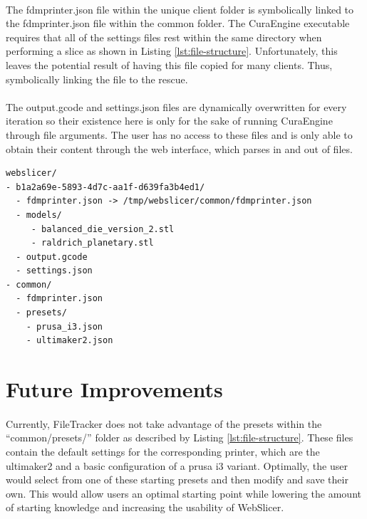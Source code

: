 \paragraph{}
The fdmprinter.json file within the unique client folder is symbolically linked to the fdmprinter.json file within the common folder. 
The CuraEngine executable requires that all of the settings files rest within the same directory when performing a slice as shown in Listing \ref{lst:file-structure}.
Unfortunately, this leaves the potential result of having this file copied for many clients. 
Thus, symbolically linking the file to the rescue.

\paragraph{}
The output.gcode and settings.json files are dynamically overwritten for every iteration so their existence here is only for the sake of running CuraEngine through file arguments.
The user has no access to these files and is only able to obtain their content through the web interface, which parses in and out of files.

\begin{lstlisting}[language=XML, label={lst:file-structure}, caption=WebSlicer's underlying file structure supported by FileTracker.]
webslicer/
- b1a2a69e-5893-4d7c-aa1f-d639fa3b4ed1/
  - fdmprinter.json -> /tmp/webslicer/common/fdmprinter.json
  - models/
     - balanced_die_version_2.stl
     - raldrich_planetary.stl
  - output.gcode
  - settings.json
- common/
  - fdmprinter.json
  - presets/
    - prusa_i3.json
    - ultimaker2.json
\end{lstlisting}

\section{Future Improvements}
\paragraph{}
Currently, FileTracker does not take advantage of the presets within the ``common/presets/'' folder as described by Listing \ref{lst:file-structure}. 
These files contain the default settings for the corresponding printer, which are the ultimaker2 and a basic configuration of a prusa i3 variant. 
Optimally, the user would select from one of these starting presets and then modify and save their own.
This would allow users an optimal starting point while lowering the amount of starting knowledge and increasing the usability of WebSlicer.

